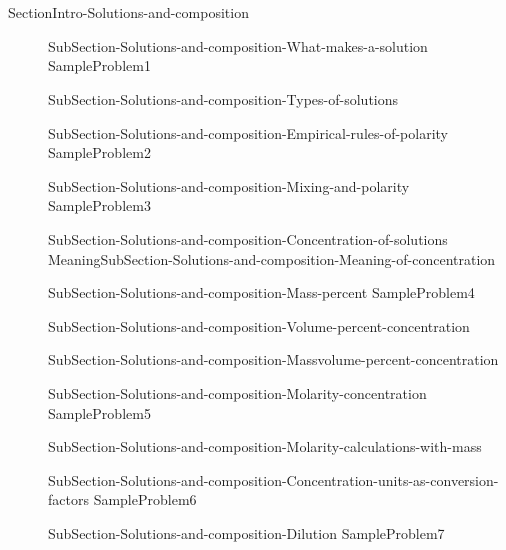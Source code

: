 \documentclass[main.tex]{subfiles} %
\begin{document}
\section{\color{blue!30!black}{Solutions and composition}}
{SectionIntro-Solutions-and-composition}
\sloppy\begin{description}
\item[]{SubSection-Solutions-and-composition-What-makes-a-solution}
{SampleProblem1}
\item[] {SubSection-Solutions-and-composition-Types-of-solutions}
 \hspace{-0cm}{Figure-Dissolution}
\item[] {SubSection-Solutions-and-composition-Empirical-rules-of-polarity}
{SampleProblem2}
\item[]{SubSection-Solutions-and-composition-Mixing-and-polarity}
 \hspace{2cm}{Table-Polarity-and-mixing}	
{SampleProblem3}
\item[]{SubSection-Solutions-and-composition-Concentration-of-solutions}
Meaning{SubSection-Solutions-and-composition-Meaning-of-concentration}
\item[]{SubSection-Solutions-and-composition-Mass-percent}
{SampleProblem4}
\item[] {SubSection-Solutions-and-composition-Volume-percent-concentration}
\item[]{SubSection-Solutions-and-composition-Massvolume-percent-concentration}
\item[]{SubSection-Solutions-and-composition-Molarity-concentration}
{SampleProblem5}
\item[]{SubSection-Solutions-and-composition-Molarity-calculations-with-mass}


\item[]{SubSection-Solutions-and-composition-Concentration-units-as-conversion-factors}
{SampleProblem6}
\item[]{SubSection-Solutions-and-composition-Dilution}
{SampleProblem7}
\end{description}
\end{document}
